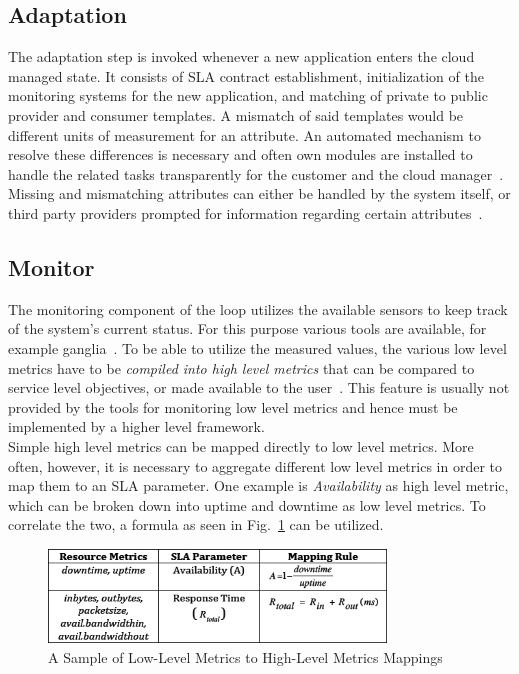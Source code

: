 \documentclass[a4paper]{llncs}
\begin{document}
\subsection{Adaptation}
\label{sec:adaption}
The adaptation step is invoked whenever a new application enters the cloud managed state. It consists of SLA contract establishment, initialization of the monitoring systems for the new application, and matching of private to public provider and consumer templates. A mismatch of said templates would be different units of measurement for an attribute. An automated mechanism to resolve these differences is necessary and often own modules are installed to handle the related tasks transparently for the customer and the cloud manager~\cite{Freitas10}. Missing and mismatching attributes can either be handled by the system itself, or third party providers prompted for information regarding certain attributes~\cite{Maurer11}. 

\subsection{Monitor}
The monitoring component of the loop utilizes the available sensors to keep track of the system’s current status. For this purpose various tools are available, for example ganglia~\cite{Massie04}. To be able to utilize the measured values, the various low level metrics have to be \textit{compiled into high level metrics} that can be compared to service level objectives, or made available to the user~\cite{Maurer11}. This feature is usually not provided by the tools for monitoring low level metrics and hence must be implemented by a higher level framework.\\

Simple high level metrics can be mapped directly to low level metrics. More often, however, it is necessary to aggregate different low level metrics in order to map them to an SLA parameter. One example is \textit{Availability} as high level metric, which can be broken down into uptime and downtime as low level metrics. To correlate the two, a formula as seen in Fig.~\ref{fig:lo2hi} can be utilized.\\

\begin{figure}[Ht]
	\centering
		\includegraphics[width=0.8\textwidth]{figs/lo2hi.jpg}
	\caption{A Sample of Low-Level Metrics to High-Level Metrics Mappings}
	\label{fig:lo2hi}
\end{figure}
\end{document}
